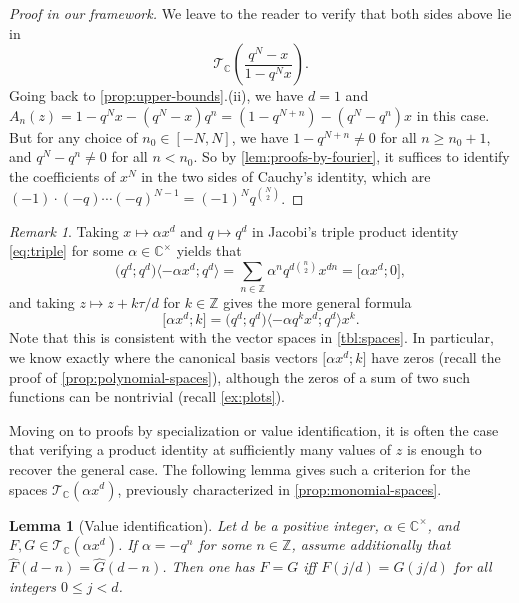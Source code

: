 \documentclass[reqno,11pt]{amsart}
\newtheorem{lemma}[theorem]{Lemma}
\theoremstyle{definition}
\theoremstyle{remark}
\newtheorem*{remark}{Remark}
\numberwithin{equation}{section}
\newcommand{\Z}{\mathbb{Z}}
\newcommand{\C}{\mathbb{C}}
\newcommand{\mT}{\mathcal{T}}
\newcommand{\vect}[2]{\big[{#1};{#2}\big]}
\renewcommand{\hat}{\widehat}
\newcommand{\fix}[1]{\textcolor{blue}{\large (#1)\normalsize}}
\begin{document}
\begin{proof}[Proof in our framework]
We leave to the reader to verify that both sides above lie in
\[
    \mT_\C\left(\frac{q^N - x}{1 - q^{N}x}\right).
\]
Going back to \cref{prop:upper-bounds}.(ii), we have $d = 1$ and $A_n(z) = 1 - q^{N}x - \left(q^N - x\right)q^n = \left(1 - q^{N+n}\right) - \left(q^{N} - q^{n} \right)x$ in this case. But for any choice of $n_0 \in [-N, N]$, we have $1 - q^{N+n} \neq 0$ for all $n \ge n_0 + 1$, and $q^{N} - q^{n} \neq 0$ for all $n < n_0$. So by \cref{lem:proofs-by-fourier}, it suffices to identify the coefficients of $x^N$ in the two sides of Cauchy's identity, which are $(-1) \cdot (-q) \cdots (-q)^{N-1} = (-1)^N q^{\binom{N}{2}}$.
\end{proof}

\begin{remark}
Taking $x \mapsto \alpha x^d$ and $q \mapsto q^d$ in Jacobi's triple product identity \cref{eq:triple} for some $\alpha \in \C^\times$ yields that
\[
    \big(q^d; q^d\big)\big\langle {-\alpha} x^d; q^d \big\rangle = 
    \sum_{n \in \Z} \alpha^n q^{d\binom{n}{2}} x^{dn} 
    =
    \vect{\alpha x^d}{0},
\]
and taking $z \mapsto z + k\tau/d$ for $k \in \Z$ gives the more general formula
\begin{equation}\label{eq:canonical-formula}
        \vect{\alpha x^d}{k} = \big(q^d; q^d\big)\big\langle {-\alpha} q^k x^d ; q^d \big\rangle x^k.
\end{equation}
Note that this is consistent with the vector spaces in \cref{tbl:spaces}. In particular, we know exactly where the canonical basis vectors $\vect{\alpha x^d}{k}$ have zeros (recall the proof of \cref{prop:polynomial-spaces}), although the zeros of a sum of two such functions can be nontrivial (recall \cref{ex:plots}). 
\end{remark}
Moving on to proofs by specialization or value identification, it is often the case that verifying a product identity at sufficiently many values of $z$ is enough to recover the general case. The following lemma gives such a criterion for the spaces $\mT_\C\left(\alpha x^d \right)$, previously characterized in \cref{prop:monomial-spaces}.
\begin{lemma}[Value identification]  \label{lem:proofs-by-value}
Let $d$ be a positive integer, $\alpha \in \C^\times$, and $F, G \in \mT_\C\left(\alpha x^d\right)$. If $\alpha = -q^n$ for some $n \in \Z$, assume additionally that $\hat{F}(d-n) = \hat{G}(d-n)$. Then one has $F = G$ iff $F(j/d) = G(j/d)$ for all integers $0 \le j < d$.
\end{lemma}
\end{document}
